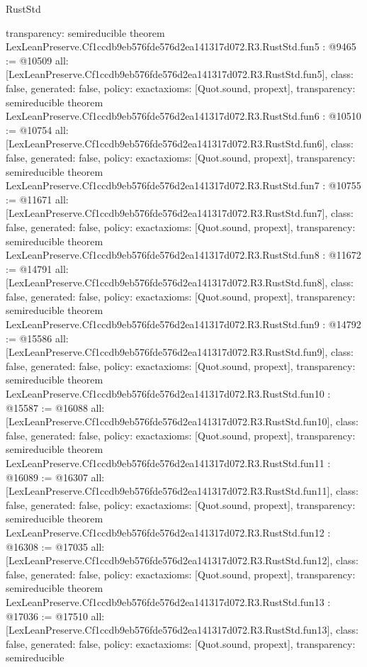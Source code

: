 \begin{lexlean}{RustStd}
\begin{coremodule}
{  transparency: semireducible
}
theorem LexLeanPreserve.Cf1ccdb9eb576fde576d2ea141317d072.R3.RustStd.fun5 : @9465 := @10509 {
  all: [LexLeanPreserve.Cf1ccdb9eb576fde576d2ea141317d072.R3.RustStd.fun5],
  class: false,
  generated: false,
  policy: exact{axioms: [Quot.sound, propext]},
  transparency: semireducible
}
theorem LexLeanPreserve.Cf1ccdb9eb576fde576d2ea141317d072.R3.RustStd.fun6 : @10510 := @10754 {
  all: [LexLeanPreserve.Cf1ccdb9eb576fde576d2ea141317d072.R3.RustStd.fun6],
  class: false,
  generated: false,
  policy: exact{axioms: [Quot.sound, propext]},
  transparency: semireducible
}
theorem LexLeanPreserve.Cf1ccdb9eb576fde576d2ea141317d072.R3.RustStd.fun7 : @10755 := @11671 {
  all: [LexLeanPreserve.Cf1ccdb9eb576fde576d2ea141317d072.R3.RustStd.fun7],
  class: false,
  generated: false,
  policy: exact{axioms: [Quot.sound, propext]},
  transparency: semireducible
}
theorem LexLeanPreserve.Cf1ccdb9eb576fde576d2ea141317d072.R3.RustStd.fun8 : @11672 := @14791 {
  all: [LexLeanPreserve.Cf1ccdb9eb576fde576d2ea141317d072.R3.RustStd.fun8],
  class: false,
  generated: false,
  policy: exact{axioms: [Quot.sound, propext]},
  transparency: semireducible
}
theorem LexLeanPreserve.Cf1ccdb9eb576fde576d2ea141317d072.R3.RustStd.fun9 : @14792 := @15586 {
  all: [LexLeanPreserve.Cf1ccdb9eb576fde576d2ea141317d072.R3.RustStd.fun9],
  class: false,
  generated: false,
  policy: exact{axioms: [Quot.sound, propext]},
  transparency: semireducible
}
theorem LexLeanPreserve.Cf1ccdb9eb576fde576d2ea141317d072.R3.RustStd.fun10 : @15587 := @16088 {
  all: [LexLeanPreserve.Cf1ccdb9eb576fde576d2ea141317d072.R3.RustStd.fun10],
  class: false,
  generated: false,
  policy: exact{axioms: [Quot.sound, propext]},
  transparency: semireducible
}
theorem LexLeanPreserve.Cf1ccdb9eb576fde576d2ea141317d072.R3.RustStd.fun11 : @16089 := @16307 {
  all: [LexLeanPreserve.Cf1ccdb9eb576fde576d2ea141317d072.R3.RustStd.fun11],
  class: false,
  generated: false,
  policy: exact{axioms: [Quot.sound, propext]},
  transparency: semireducible
}
theorem LexLeanPreserve.Cf1ccdb9eb576fde576d2ea141317d072.R3.RustStd.fun12 : @16308 := @17035 {
  all: [LexLeanPreserve.Cf1ccdb9eb576fde576d2ea141317d072.R3.RustStd.fun12],
  class: false,
  generated: false,
  policy: exact{axioms: [Quot.sound, propext]},
  transparency: semireducible
}
theorem LexLeanPreserve.Cf1ccdb9eb576fde576d2ea141317d072.R3.RustStd.fun13 : @17036 := @17510 {
  all: [LexLeanPreserve.Cf1ccdb9eb576fde576d2ea141317d072.R3.RustStd.fun13],
  class: false,
  generated: false,
  policy: exact{axioms: [Quot.sound, propext]},
  transparency: semireducible
}
\end{coremodule}
\end{lexlean}
